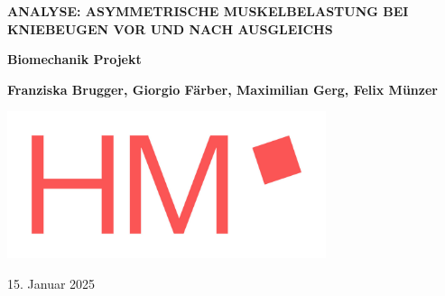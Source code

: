 
\begin{titlepage}
   \begin{center}
       \vspace*{1cm}

       \Huge
       \textbf{
         ANALYSE: ASYMMETRISCHE MUSKELBELASTUNG BEI KNIEBEUGEN VOR UND NACH AUSGLEICHS
       }

       \vspace{0.5cm}
       \LARGE

       \vspace{1.5cm}

       \textbf{Biomechanik Projekt}
       \vfill

       \textbf{Franziska Brugger, Giorgio Färber, Maximilian Gerg, Felix Münzer}
       \vfill

       \begin{center}
         \includegraphics[width=0.7\textwidth]{img/hm-logo.jpg}
         \\
         \normalsize
       \end{center}


       \vfill


       \Large


       \vspace{0.8cm}
       \centering

       15. Januar 2025



   \end{center}
 \end{titlepage}